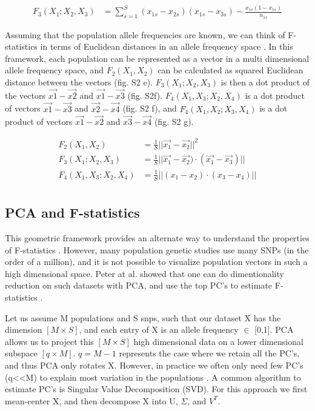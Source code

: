 \documentclass[12pt, letterpaper]{article}
\begin{document}
\begin{align}\label{eq:f2_correction}
F_3(X_1;X_2,X_3) &= \sum_{s=1}^S(x_{1s} - x_{2s})(x_{1s} - x_{3s}) - \frac{x_{1s}(1-x_{1s})}{n_{1s}}
\end{align}

Assuming that the population allele frequencies are known, we can think of F-statistics in terms of Euclidean distances in an allele frequency space \cite{oteo-garcia_geometrical_2021}. In this framework, each population can be represented as a vector in a multi dimensional allele frequency space, and $F_2(X_1, X_2)$ can be calculated as squared Euclidean distance between the vectors (fig. S2 e). $F_3(X_1;X_2,X_3)$ is then a dot product of the vectors $\Vec{x1} - \Vec{x2}$ and $\Vec{x1} - \Vec{x3}$ (fig. S2f). $F_4(X_1,X_3;X_2,X_4)$ is a dot product of vectors $\Vec{x1} - \Vec{x3}$ and $\Vec{x2} - \Vec{x4}$ (fig. S2 f), and $F_4(X_1,X_2;X_3,X_4)$ is a dot product of vectors $\Vec{x1} - \Vec{x2}$ and $\Vec{x3} - \Vec{x4}$ (fig. S2 g). 

\begin{align}\label{eq:f_intro}
F_2(X_1,X_2) &= \frac{1}{S}||\Vec{x_{1}} - \vec{x_{2}}||^2\nonumber\\
F_3(X_1;X_2,X_3) &= \frac{1}{S}||\vec{x_{1}} - \vec{x_{2}})\cdot(\vec{x_{1}} - \vec{x_{3}})||\nonumber\\
F_4(X_1,X_3;X_2,X_4) &= \frac{1}{S}||(x_{1} - x_{2})\cdot(x_{3} - x_{4})||\nonumber\\
\end{align}


\subsection{PCA and F-statistics}

This geometric framework provides an alternate way to understand the properties of F-statistics \cite{oteo-garcia_geometrical_2021}. However, many population genetic studies use many SNPs (in the order of a million), and it is not possible to visualize population vectors in such a high dimensional space. Peter at al. showed that one can do dimentionality reduction on such datasets with PCA, and use the top PC's to estimate F-statistics \cite{peter_geometric_2022}.

Let us assume M populations and S snps, such that our dataset X has the dimension $[M \times S]$, and each entry of X is an allele frequency $\in$ [0,1]. PCA allows us to project this $[M \times S]$ high dimensional data on a lower dimensional subspace $[q \times M]$. $q = M-1$ represents the case where we retain all the PC's, and thus PCA only rotates X. However, in practice we often only need few PC's (q<<M) to explain most variation in the populations \cite{peter_geometric_2022}. A common algorithm to estimate PC's is Singular Value Decomposition (SVD). For this approach we first mean-center X, and then decompose X into U, $\Sigma$, and $V^T$.
\end{document}
